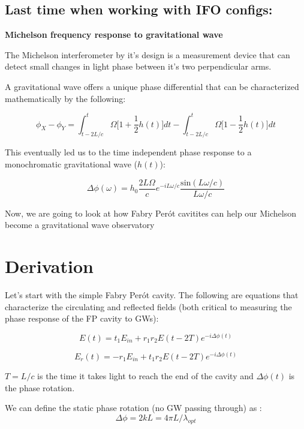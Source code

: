 \documentclass[11pt]{article}
\begin{document}
\hypertarget{last-time-when-working-with-ifo-configs}{%
\subsection{Last time when working with IFO
configs:}\label{last-time-when-working-with-ifo-configs}}

\textbf{Michelson frequency response to gravitational wave}

The Michelson interferometer by it's design is a measurement device that
can detect small changes in light phase between it's two perpendicular
arms.

A gravitational wave offers a unique phase differential that can be
characterized mathematically by the following:

\[
\phi_X - \phi_Y = \int_{t-2L/c}^{t} \Omega \bigg[1 + \frac{1}{2}h(t)\bigg]dt - \int_{t-2L/c}^{t} \Omega \bigg[1 - \frac{1}{2}h(t)\bigg]dt \label{eq1}\tag{1}
\]

This eventually led us to the time independent phase response to a
monochromatic gravitational wave (\(h(t)\)):

\[
\Delta \phi (\omega) = h_0\frac{2 L \Omega}{c}e^{-i L \omega / c} \frac{\mathrm{sin}(L \omega /c)}{L \omega /c} \label{eq2}\tag{2}
\]

Now, we are going to look at how Fabry Perót cavitites can help our
Michelson become a gravitational wave observatory

    \hypertarget{derivation}{%
\section{Derivation}\label{derivation}}

Let's start with the simple Fabry Perót cavity. The following are
equations that characterize the circulating and reflected fields (both
critical to measuring the phase response of the FP cavity to GWs):

\[
E(t) = t_1 E_{in} + r_1 r_2 E(t - 2T) e^{-i \Delta \phi(t)} \label{eq3}\tag{3}
\]

\[
E_r(t) = -r_1 E_{in} + t_1 r_2 E(t - 2T) e^{-i \Delta \phi(t)} \label{eq4}\tag{4}
\]

\(T = L/c\) is the time it takes light to reach the end of the cavity
and \(\Delta \phi(t)\) is the phase rotation.

We can define the static phase rotation (no GW passing through) as :
\[\Delta \phi = 2kL = 4 \pi L /\lambda_{opt}  \label{eq5}\tag{5}\]
\end{document}
